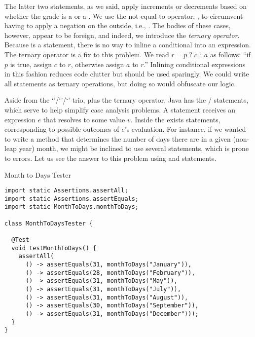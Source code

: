 The latter two  statements, as we said, apply increments or decrements based on whether the grade is a \ttt{+} or a \ttt{-}. We use the not-equal-to operator, \ttt{!=}, to circumvent having to apply a negation on the outside, i.e., . The bodies of these cases, however, appear to be foreign, and indeed, we introduce the \textit{ternary operator}. Because  is a statement, there is no way to inline a conditional into an expression. The ternary operator is a fix to this problem. We read ${r = p\;?\;c\;:\;a}$ as follows: ``if $p$ is true, assign $c$ to $r$, otherwise assign $a$ to $r$.'' Inlining conditional expressions in this fashion reduces code clutter but should be used sparingly. We could write all  statements as ternary operations, but doing so would obfuscate our logic.

Aside from the `'/`'/`' trio, plus the ternary operator, Java has the / statements, which serve to help simplify case analysis problems. A  statement receives an expression $e$ that resolves to some value $v$. Inside the  exists  statements, corresponding to possible outcomes of $e$'s evaluation. For instance, if we wanted to write a method that determines the number of days there are in a given (non-leap year) month, we might be inclined to use several  statements, which is prone to errors. Let us see the answer to this problem using  and  statements.

\begin{cl}[]{Month to Days Tester}
\begin{lstlisting}[language=MyJava]
import static Assertions.assertAll;
import static Assertions.assertEquals;
import static MonthToDays.monthToDays;

class MonthToDaysTester {

  @Test
  void testMonthToDays() {
    assertAll(
      () -> assertEquals(31, monthToDays("January")),
      () -> assertEquals(28, monthToDays("February")),
      () -> assertEquals(31, monthToDays("May")),
      () -> assertEquals(31, monthToDays("July")),
      () -> assertEquals(31, monthToDays("August")),
      () -> assertEquals(30, monthToDays("September")),
      () -> assertEquals(31, monthToDays("December")));
  }
}
\end{lstlisting}
\end{cl}

